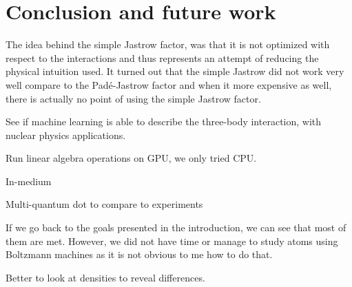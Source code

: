 \chapter{Conclusion and future work} \label{sec:conclusion}
The idea behind the simple Jastrow factor, was that it is not optimized with respect to the interactions and thus represents an attempt of reducing the physical intuition used. It turned out that the simple Jastrow did not work very well compare to the Padé-Jastrow factor and when it more expensive as well, there is actually no point of using the simple Jastrow factor. 

See if machine learning is able to describe the three-body interaction, with nuclear physics applications. 

Run linear algebra operations on GPU, we only tried CPU. 

In-medium

Multi-quantum dot to compare to experiments

If we go back to the goals presented in the introduction, we can see that most of them are met. However, we did not have time or manage to study atoms using Boltzmann machines as it is not obvious to me how to do that. 

Better to look at densities to reveal differences. 